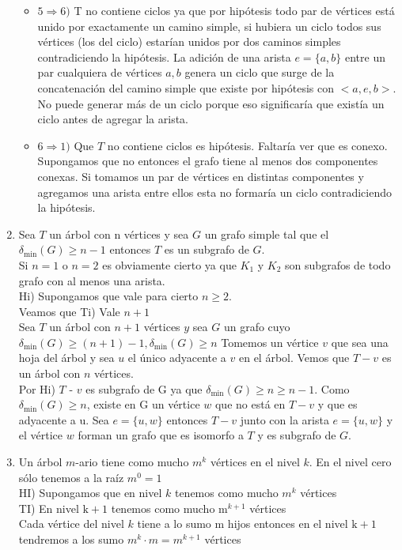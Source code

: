 \documentclass{article}
\begin{document}
\begin{enumerate}
\begin{itemize}
        \item  $5\Rightarrow 6)$ T no contiene ciclos ya que por hipótesis todo par de vértices está unido por exactamente un camino simple, si hubiera un ciclo todos sus vértices (los del ciclo) estarían unidos por dos caminos simples contradiciendo la hipótesis. La adición de una arista $e=\{a, b\}$ entre un par cualquiera de vértices $a, b$ genera un ciclo que surge de la concatenación del camino simple que existe por hipótesis con $<a, e, b>$. No puede generar más de un ciclo porque eso significaría que existía un ciclo antes de agregar la arista.
        \item $6\Rightarrow 1)$ Que $T$ no contiene ciclos es hipótesis. Faltaría ver que es conexo. Supongamos que no entonces el grafo tiene al menos dos componentes conexas. Si tomamos un par de vértices en distintas componentes y agregamos una arista entre ellos esta no formaría un ciclo contradiciendo la hipótesis.
    \end{itemize}
    
    \item Sea $T$ un árbol con n vértices y sea $G$ un grafo simple tal que el $\delta_{\min }(G) \geq n-1$ entonces $T$ es un subgrafo de $G$. \\
    Si $n=1$ o $n=2$ es obviamente cierto ya que $K_{1}$ y $K_{2}$ son subgrafos de todo grafo con al menos una arista. \\
    Hi) Supongamos que vale para cierto $n \geq 2$. \\
    Veamos que Ti) Vale $n+1$ \\
    Sea $T$ un árbol con $n+1$ vértices $y$ sea $G$ un grafo cuyo $\delta_{\min }(G) \geq(n+1)-1, \delta_{\min }(G) \geq n$ Tomemos un vértice $v$ que sea una hoja del árbol y sea $u$ el único adyacente a $v$ en el árbol. Vemos que $T-v$ es un árbol con $n$ vértices.\\
    Por Hi) $T$ - $v$ es subgrafo de G ya que $\delta_{\min }(G) \geq n \geq n-1$. Como $\delta_{\min }(G) \geq n$, existe en G un vértice $w$ que no está en $T-v$ y que es adyacente a u. Sea $e=\{u, w\}$ entonces $T-v$ junto con la arista $e=\{u, w\}$ y el vértice $w$ forman un grafo que es isomorfo a $T$ y es subgrafo de $G$.
    
    \item Un árbol $m$-ario tiene como mucho $m^{k}$ vértices en el nivel $k$. En el nivel cero sólo tenemos a la raíz $m^{0}=1$ \\
    HI) Supongamos que en nivel $k$ tenemos como mucho $m^{k}$ vértices \\
    TI) En nivel $\mathrm{k}+1$ tenemos como mucho $\mathrm{m}^{k+1}$ vértices \\
    Cada vértice del nivel $k$ tiene a lo sumo $\mathrm{m}$ hijos entonces en el nivel $\mathrm{k}+1$ tendremos a los sumo $m^{k} \cdot m=m^{k+1}$ vértices
    

\end{enumerate}
\end{document}
